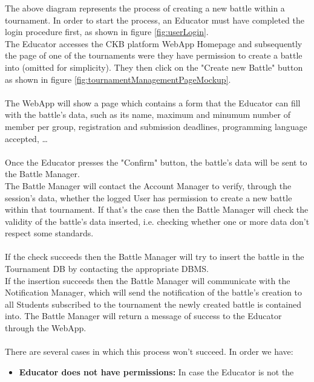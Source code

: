 \documentclass{article}
\begin{document}
{        The above diagram represents the process of creating a new battle within a tournament. 
        In order to start the process, an Educator must have completed the login 
        procedure first, as shown in figure \ref{fig:userLogin}. \\
        The Educator accesses the CKB platform WebApp Homepage and subsequently
        the page of one of the tournaments were they have permission to create a battle into
        (omitted for simplicity).
        They then click on the "Create new Battle" button as shown in figure \ref{fig:tournamentManagementPageMockup}.
        \\ \\
        The WebApp will show a page which contains a form that the Educator can fill with
        the battle's data, such as its name, maximum and minumum number of member per group,
        registration and submission deadlines, programming language accepted, \dots 
        \\ \\
        Once the Educator presses the "Confirm" button,
        the battle's data will be sent to the Battle Manager. \\
        The Battle Manager will contact the Account Manager to verify, through the session's 
        data, whether the logged User has permission to create a new battle within that 
        tournament. 
        If that's the case then the Battle Manager will check the validity of the battle's data 
        inserted, i.e. checking whether one or more data don't respect some standards.
        \\ \\
        If the check succeeds then the Battle Manager will try to insert the battle in the Tournament DB
        by contacting the appropriate DBMS. \\
        If the insertion succeeds then the Battle Manager will communicate with the Notification
        Manager, which will send the notification of the battle's creation to all Students
        subscribed to the tournament the newly created battle is contained into.
        The Battle Manager will return a message of success to 
        the Educator through the WebApp.
        \\ \\
        There are several cases in which this process won't succeed. In order we have:
        \begin{itemize}
            \item \textbf{Educator does not have permissions:} In case the Educator is not the 

\end{itemize}}
\end{document}
